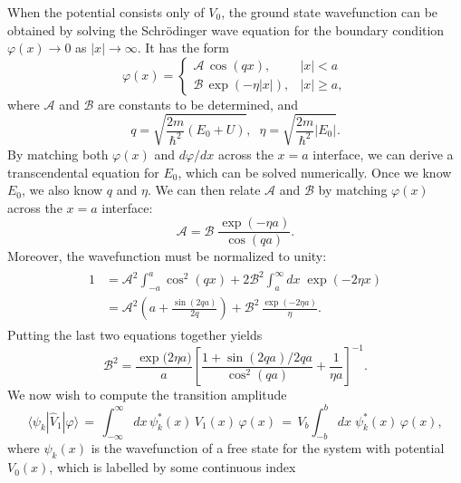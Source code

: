 \documentclass[pra,12pt]{revtex4}
\begin{document}
When the potential consists only of $V_0$, the ground state
wavefunction can be obtained by solving the Schr\"odinger wave
equation for the boundary condition $\varphi(x) \rightarrow 0$ as
$|x|\rightarrow\infty$.  It has the form
\begin{equation}
  \varphi(x) = \begin{cases}\mathcal{A}\,\cos(qx), & |x| < a \\
    \mathcal{B} \, \exp\left(-\eta|x|\right), & |x| \ge a,\end{cases}
\end{equation}
where $\mathcal{A}$ and $\mathcal{B}$ are constants to be determined,
and
\begin{equation}
  q = \sqrt{\frac{2m}{\hbar^2}(E_0+U)}, \;\; \eta = \sqrt{\frac{2m}{\hbar^2}|E_0|}.
\end{equation}
By matching both $\varphi(x)$ and $d\varphi/dx$ across the $x=a$
interface, we can derive a transcendental equation for $E_0$, which
can be solved numerically.  Once we know $E_0$, we also know $q$ and
$\eta$.  We can then relate $\mathcal{A}$ and $\mathcal{B}$ by
matching $\varphi(x)$ across the $x=a$ interface:
\begin{equation}
  \mathcal{A} = \mathcal{B}\; \frac{\exp(-\eta a)}{\cos(qa)}.
\end{equation}
Moreover, the wavefunction must be normalized to unity:
\begin{align}
  \begin{aligned}1 &= \mathcal{A}^2 \int_{-a}^a \cos^2(qx) + 2\mathcal{B}^2 \int_a^\infty dx\; \exp(-2\eta x) \\ &= \mathcal{A}^2 \left(a+\frac{\sin(2qa)}{2q}\right) + \mathcal{B}^2\, \frac{\exp(-2\eta a)}{\eta}.\end{aligned}
\end{align}
Putting the last two equations together yields
\begin{equation}
  \mathcal{B}^2 = \frac{\exp\big(2\eta a\big)}{a} \left[\frac{1+\sin(2qa)/2qa}{\cos^2(qa)}+\frac{1}{\eta a}\right]^{-1}.
\end{equation}
We now wish to compute the transition amplitude
\begin{equation}
  \langle\psi_k|\hat{V}_1|\varphi\rangle \,=\, \int_{-\infty}^\infty dx \, \psi_k^*(x)\, V_1(x)\, \varphi(x) \,=\, V_b \int_{-b}^b dx \; \psi_k^*(x) \,\varphi(x),
\end{equation}
where $\psi_k(x)$ is the wavefunction of a free state for the system
with potential $V_0(x)$, which is labelled by some continuous index
\end{document}
